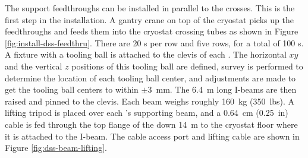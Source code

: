 The  support feedthroughs can be installed in parallel to the  crosses. This is the first step in the  installation. A gantry crane on top of the cryostat picks up the feedthroughs and feeds them into the cryostat crossing tubes as shown in Figure \ref{fig:install-dss-feedthru}. There are \num{20} \fdth{}s per row and five rows, for a total of \num{100} \fdth{}s.  A fixture with a tooling ball is attached to the clevis of each \fdth{}.  The horizontal $xy$ and the vertical $z$ positions of this tooling ball are defined, survey is performed to determine the location of each tooling ball center, and adjustments are made to get the tooling ball centers to within $\pm$\SI{3}{mm}.   The \SI{6.4}{m} long I-beams are then raised and pinned to the clevis.  Each beam weighs roughly \SI{160}{kg} (\SI{350}{lbs}). A lifting tripod is placed over each  \fdth{}'s supporting beam, and a \SI{0.64}{cm} (\SI{0.25}{in})  %
cable is fed through the top flange of the \fdth down \SI{14}{m} to the cryostat floor where it is attached to the I-beam. The cable access port and lifting cable are shown in Figure \ref{fig:dss-beam-lifting}. 
